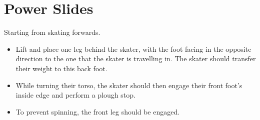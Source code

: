 \section{Power Slides}
\label{sec:stopping/power_slides}

Starting from skating forwards.

\begin{itemize}
\item Lift and place one leg behind the skater, with the foot facing in the opposite direction to the one that the skater is travelling in. The skater should transfer their weight to this back foot.
\item While turning their torso, the skater should then engage their front foot's inside edge and perform a plough stop. 
\item To prevent spinning, the front leg should be engaged.
\end{itemize}
